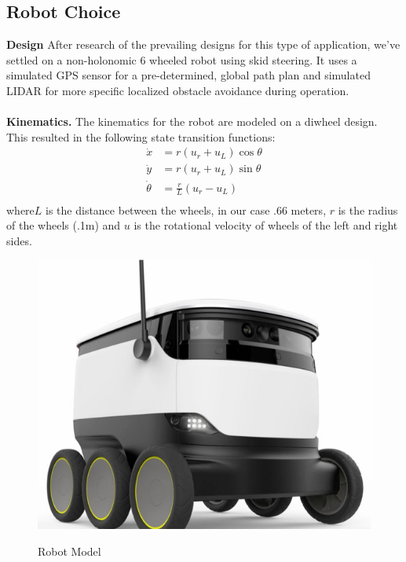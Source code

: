 \documentclass{article}
\begin{document}
\begin{multicols}{2}
\subsection*{Robot Choice}
\textbf{Design} After research of the prevailing designs for this type of application, we've settled on a non-holonomic 6 wheeled robot using skid steering. It uses a simulated GPS sensor for a pre-determined, global path plan and simulated LIDAR for more specific localized obstacle avoidance during operation. \\
\vspace{2mm}\\
\noindent \textbf{Kinematics.} The kinematics for the robot are modeled on a diwheel design.  This resulted in the following state transition functions:
\begin{equation}
\begin{split}
\dot{x}&=r(u_r+u_L)\cos\theta\\
\dot{y}&=r(u_r+u_L)\sin\theta\\
\dot{\theta}&=\frac{r}{L}(u_r-u_L)\\
\end{split}
\end{equation}
\noindent where$ L$ is the distance between the wheels, in our case .66 meters,  $r$ is the radius of the wheels (.1m) and $u$ is the rotational velocity of wheels of the left and right sides.\\

\begin{figure}[H]
   \centering
    \includegraphics[width = .75\columnwidth]{figures/delbot.png}
     \label{fig:delbot}
     \caption{Robot Model}
\end{figure}

\end{multicols}
\end{document}
